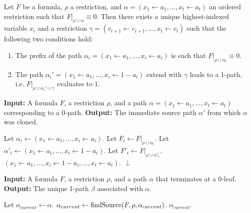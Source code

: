 \begin{claim}
\label{claim:cloned-path-source-stage}
Let $F$ be a \demorgan formula, $\rho$ a restriction, and $\alpha = (x_1 \gets a_1, \dots, x_t \gets a_t)$ an ordered restriction such that $F|_{\rho \cup \alpha} \equiv 0$. Then there exists a unique highest-indexed variable $x_i$ and a restriction $\gamma = (v_{i+1} \gets c_{i+1}, \dots, x_t \gets c_t)$ such that the following two conditions hold:
\begin{enumerate}
    \item The prefix of the path $\alpha_i = (x_1 \gets a_1, \dots, x_i \gets a_i)$ is such that $F|_{\rho \cup \alpha_i} \equiv 0$.
    \item The path $\alpha_i' = (x_1 \gets a_1, \dots, x_i \gets 1 - a_i)$ extend with $\gamma$ leads to a 1-path, i.e. $F|_{\rho \cup \alpha_i' \cup \gamma}$ evaluates to $1$.
\end{enumerate}
\end{claim}

\begin{algorithm}[H]
    \caption{$\mathbf{findSource}(F, \rho, \alpha)$}
    \label{alg:find-source}
    \textbf{Input:} A \demorgan formula $F$, a restriction $\rho$, and a path $\alpha = (x_1 \gets a_1, \dots, x_t \gets a_t)$ corresponding to a 0-path.
    \textbf{Output:} The immediate source path $\alpha'$ from which $\alpha$ was cloned.
    \begin{algorithmic}[1]
            \State Let $\alpha_i \gets (x_1 \gets a_1, \dots, x_i \gets a_i)$.
            \State Let $F_i \gets F|_{\rho \cup \alpha_i}$.
                \State Let $\alpha'_i \gets (x_1 \gets a_1, \dots, x_i \gets 1 - a_i)$.
                \State Let $F'_i \gets F|_{\rho \cup \alpha'_i}$.
                        \State \Return $(x_1 \gets a_1, \dots, x_i \gets 1 - a_i, \dots, x_t \gets a_t)$.
                    \EndIf
                \EndFor
            \EndIf
        \EndFor
        \State \Return $\perp$ 
    \end{algorithmic}
\end{algorithm}

\begin{algorithm}[H]
    \caption{$Assoc_{\to 1}(F, \rho, \alpha)$: Finding the Associated 1-Path}
    \label{alg:assoc}
    \textbf{Input:} A \demorgan formula $F$, a restriction $\rho$, and a path $\alpha$ that terminates at a 0-leaf. \\
    \textbf{Output:} The unique 1-path $\beta$ associated with $\alpha$.
    \begin{algorithmic}[1]
        \State Let $\alpha_{current} \gets \alpha$.
            \State $\alpha_{current} \gets \operatorname{findSource}(F, \rho, \alpha_{current})$.
        \EndWhile
        \State \Return $\alpha_{current}$.
    \end{algorithmic}
\end{algorithm}

